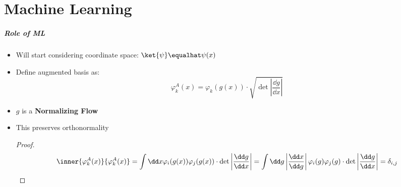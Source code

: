 \part[Part slide]{Machine Learning}
\makepart%


\begin{frame}
    \frametitle{Role of ML}
    \begin{itemize}[<+->]
        \setlength\itemsep{1em}
        \item Will start considering coordinate space: $\ket{\psi} \equalhat \psi(x)$
        \item Define augmented basis as:
            \begin{equation}
                \varphi_k^A(x) = \varphi_k(g(x)) \cdot \sqrt{\det\left|\frac{\dd g}{\dd x}\right|}
            \end{equation}
        \item $g$ is a \textbf{Normalizing Flow}
        \item This preserves orthonormality
            \begin{proof}
                \[
                    \inner{\varphi_k^A(x)}{\varphi_k^A(x)} = 
                    \int \dd x \varphi_i(g(x))\varphi_j(g(x)) \cdot \det\left|\frac{\dd g}{\dd x}\right|=
                    \int \dd g \left|\frac{\dd x}{\dd g}\right| \varphi_i(g)\varphi_j(g) \cdot \det\left|\frac{\dd g}{\dd x}\right|= \delta_{i, j}
                \]
            \end{proof} 
    \end{itemize}
\end{frame}

